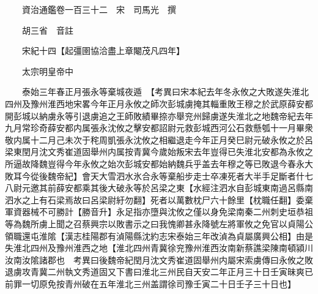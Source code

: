 










 


 
 


 

  
  
  
  
  





  
  
  
  
  
 
  

  

  
  
  



  

 
 

  
   




  

  
  


  　　資治通鑑卷一百三十二　宋　司馬光　撰

　　胡三省　音註

　　宋紀十四【起彊圉協洽盡上章閹茂凡四年】

　　太宗明皇帝中

　　泰始三年春正月張永等棄城夜遁　【考異曰宋本紀去年冬永攸之大敗遂失淮北四州及豫州淮西地宋畧今年正月永攸之師次彭城虜掩其輜重敗王穆之於武原薛安都開彭城以納虜永等引退虜追之王師敗績畢捺亦舉兖州歸虜遂失淮北之地魏帝紀去年九月常珍奇薛安都内属張永沈攸之擊安都詔尉元救彭城西河公石救懸瓠十一月畢衆敬内属十二月己未次于秺周凱張永沈攸之相繼退走今年正月癸巳尉元破永攸之於呂梁東閏月沈文秀崔道固舉州内属按青冀今歲始叛宋去年豈得已失淮北安都為永攸之所逼故降魏豈得今年永攸之始次彭城安都始納魏兵乎盖去年穆之等已敗退今春永大敗耳今從後魏帝紀】會天大雪泗水氷合永等棄船步走士卒凍死者大半手足斷者什七八尉元邀其前薛安都乘其後大破永等於呂梁之東【水經注泗水自彭城東南過呂縣南泗水之上有石梁焉故曰呂梁尉紆勿翻】死者以萬數枕尸六十餘里【枕職任翻】委棄軍資器械不可勝計【勝音升】永足指亦墮與沈攸之僅以身免梁南秦二州刺史垣恭祖等為魏所虜上聞之召蔡興宗以敗書示之曰我愧卿甚永降號左將軍攸之免官以貞陽公領職還屯淮隂【漢志桂陽郡有湞陽縣沈約志宋泰始三年改湞為貞屬廣興公相】由是失淮北四州及豫州淮西之地【淮北四州青冀徐兖豫州淮西汝南新蔡譙梁陳南頓潁川汝南汝隂諸郡也　考異曰後魏帝紀閏月沈文秀崔道固舉州内屬宋索虜傳曰永攸之敗退虜攻青冀二州執文秀道固又下書曰淮北三州民自天安二年正月三十日壬寅昧爽已前罪一切原免按青州破在五年淮北三州盖謂徐司豫壬寅二十日壬子三十日也】

